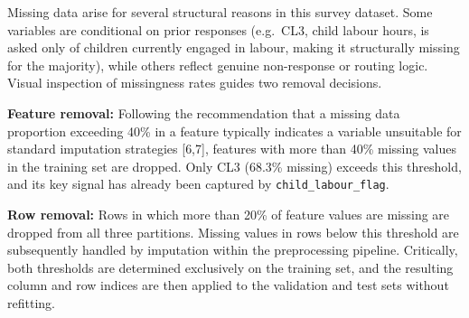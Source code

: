 \documentclass[11pt]{article}
\begin{document}
Missing data arise for several structural reasons in this survey
dataset. Some variables are conditional on prior responses (e.g.~CL3,
child labour hours, is asked only of children currently engaged in
labour, making it structurally missing for the majority), while others
reflect genuine non-response or routing logic. Visual inspection of
missingness rates guides two removal decisions.

\textbf{Feature removal:} Following the recommendation that a missing
data proportion exceeding 40\% in a feature typically indicates a
variable unsuitable for standard imputation strategies {[}6,7{]},
features with more than 40\% missing values in the training set are
dropped. Only CL3 (68.3\% missing) exceeds this threshold, and its key
signal has already been captured by \texttt{child\_labour\_flag}.

\textbf{Row removal:} Rows in which more than 20\% of feature values are
missing are dropped from all three partitions. Missing values in rows
below this threshold are subsequently handled by imputation within the
preprocessing pipeline. Critically, both thresholds are determined
exclusively on the training set, and the resulting column and row
indices are then applied to the validation and test sets without
refitting.
\end{document}
